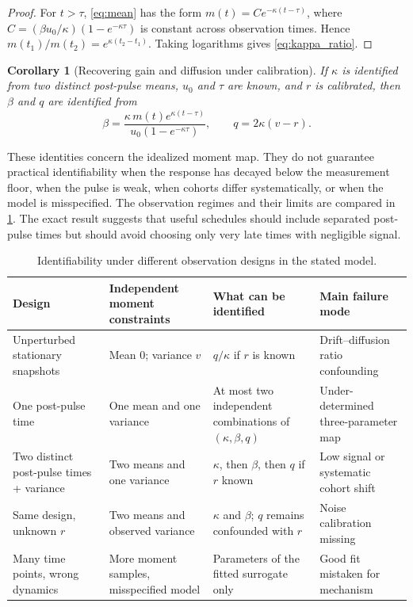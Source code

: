 \documentclass[11pt,a4paper]{article}
\newtheorem{corollary}{Corollary}
\begin{document}
\begin{proof}
For $t>\tau$, \cref{eq:mean} has the form $m(t)=C e^{-\kappa(t-\tau)}$, where $C=(\beta u_0/\kappa)(1-e^{-\kappa\tau})$ is constant across observation times. Hence $m(t_1)/m(t_2)=e^{\kappa(t_2-t_1)}$. Taking logarithms gives \cref{eq:kappa_ratio}.
\end{proof}
\begin{corollary}[Recovering gain and diffusion under calibration]
If $\kappa$ is identified from two distinct post-pulse means, $u_0$ and $\tau$ are known, and $r$ is calibrated, then $\beta$ and $q$ are identified from
\begin{equation}
\beta=\frac{\kappa\,m(t)e^{\kappa(t-\tau)}}{u_0(1-e^{-\kappa\tau})},\qquad
q=2\kappa(v-r).
\label{eq:recover}
\end{equation}
\end{corollary}
These identities concern the idealized moment map. They do not guarantee practical identifiability when the response has decayed below the measurement floor, when the pulse is weak, when cohorts differ systematically, or when the model is misspecified. The observation regimes and their limits are compared in \cref{tab:identifiability}. The exact result suggests that useful schedules should include separated post-pulse times but should avoid choosing only very late times with negligible signal.
\begin{table}[!htbp]
\centering
\small
\caption{Identifiability under different observation designs in the stated model.}
\label{tab:identifiability}
\begin{tabularx}{\linewidth}{@{}p{2.4cm}p{2.2cm}X p{2.0cm}@{}}
\toprule
Design & Independent moment constraints & What can be identified & Main failure mode\\
\midrule
Unperturbed stationary snapshots & Mean $0$; variance $v$ & $q/\kappa$ if $r$ is known & Drift--diffusion ratio confounding\\
One post-pulse time & One mean and one variance & At most two independent combinations of $(\kappa,\beta,q)$ & Under-determined three-parameter map\\
Two distinct post-pulse times + variance & Two means and one variance & $\kappa$, then $\beta$, then $q$ if $r$ known & Low signal or systematic cohort shift\\
Same design, unknown $r$ & Two means and observed variance & $\kappa$ and $\beta$; $q$ remains confounded with $r$ & Noise calibration missing\\
Many time points, wrong dynamics & More moment samples, misspecified model & Parameters of the fitted surrogate only & Good fit mistaken for mechanism\\
\bottomrule
\end{tabularx}
\end{table}
\end{document}
